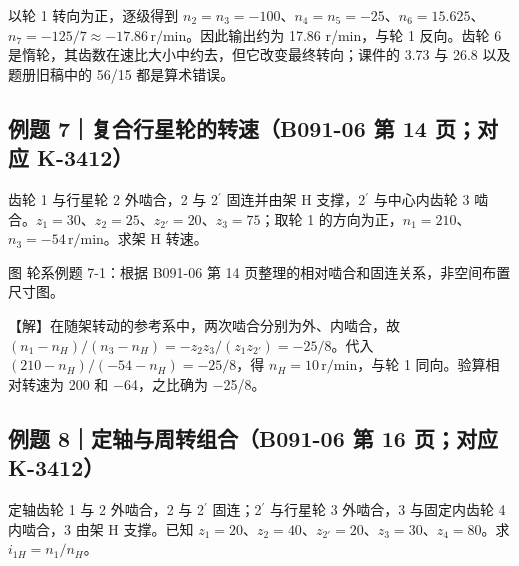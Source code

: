 \documentclass[zihao=5,a4paper,UTF8,fontset=fandol]{ctexart}
\begin{document}
以轮 1 转向为正，逐级得到 $n_2=n_3=-100$、$n_4=n_5=-25$、$n_6=15.625$、$n_7=-125/7\approx-17.86\,\mathrm{r/min}$。因此输出约为 17.86 r/min，与轮 1 反向。齿轮 6 是惰轮，其齿数在速比大小中约去，但它改变最终转向；课件的 3.73 与 26.8 以及题册旧稿中的 56/15 都是算术错误。




\subsection{例题 7｜复合行星轮的转速（B091-06 第 14 页；对应 K-3412）}

齿轮 1 与行星轮 2 外啮合，2 与 2${}^{\prime}$ 固连并由架 H 支撑，2${}^{\prime}$ 与中心内齿轮 3 啮合。$z_1=30$、$z_2=25$、$z_{2'}=20$、$z_3=75$；取轮 1 的方向为正，$n_1=210$、$n_3=-54\,\mathrm{r/min}$。求架 H 转速。


\begin{center}
\end{center}


图 轮系例题 7-1：根据 B091-06 第 14 页整理的相对啮合和固连关系，非空间布置尺寸图。


【解】在随架转动的参考系中，两次啮合分别为外、内啮合，故 $(n_1-n_H)/(n_3-n_H)=-z_2z_3/(z_1z_{2'})=-25/8$。代入 $(210-n_H)/(-54-n_H)=-25/8$，得 $n_H=10\,\mathrm{r/min}$，与轮 1 同向。验算相对转速为 200 和 $-$64，之比确为 $-$25/8。




\subsection{例题 8｜定轴与周转组合（B091-06 第 16 页；对应 K-3412）}

定轴齿轮 1 与 2 外啮合，2 与 2${}^{\prime}$ 固连；2${}^{\prime}$ 与行星轮 3 外啮合，3 与固定内齿轮 4 内啮合，3 由架 H 支撑。已知 $z_1=20$、$z_2=40$、$z_{2'}=20$、$z_3=30$、$z_4=80$。求 $i_{1H}=n_1/n_H$。
\end{document}
